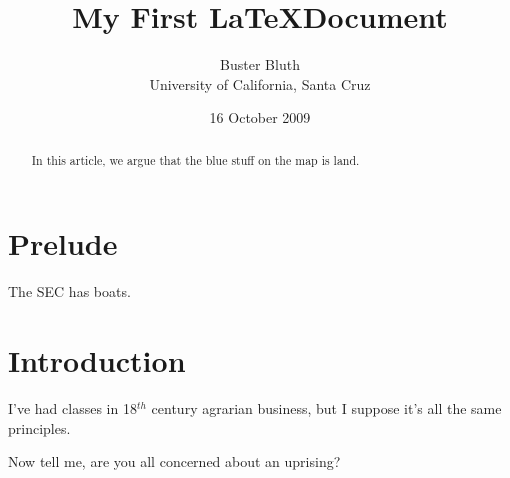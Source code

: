 \documentclass[11pt, letterpaper]{article}
\title{My First \LaTeX Document}
\author{Buster Bluth\\University of California, Santa Cruz}
\date{16 October 2009}
\begin{document}
	
	\maketitle
	
	\begin{abstract}
		In this article, we argue that the blue stuff on the map is land.
	\end{abstract}
	
	\section*{Prelude}
	
	The SEC has boats.
	
	\section{Introduction}
	
	I've had classes in 18$^{th}$ century agrarian business, but I suppose it's all the same principles.
	
	 
	 Now tell me, are you all concerned about an uprising?
	
\end{document}
